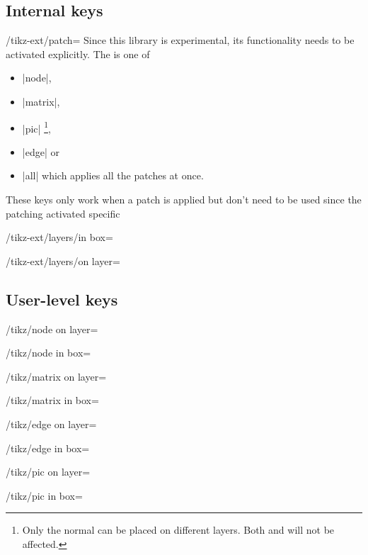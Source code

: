 \begin{multicols}{2}
\subsection{Internal keys}
\begin{key}{/tikz-ext/patch=}
Since this library is experimental, its functionality needs to be activated explicitly.
The  is one of
\begin{itemize}
\item |node|,
\item |matrix|,
\item |pic|%
  \footnote{Only the normal 
            can be placed on different layers.
            Both 
            and 
            will not be affected.},
\item |edge| or
\item |all| which applies all the patches at once.
\end{itemize}
\end{key}

These keys only work when a patch is applied but don't need to be used
since the patching activated specific
\begin{key}{/tikz-ext/layers/in box=}
\end{key}

\begin{key}{/tikz-ext/layers/on layer=}
\end{key}

\subsection{User-level keys}
\begin{key}{/tikz/node on layer=}
\end{key}
\begin{key}{/tikz/node in box=}
\end{key}

\begin{key}{/tikz/matrix on layer=}
\end{key}
\begin{key}{/tikz/matrix in box=}
\end{key}

\begin{key}{/tikz/edge on layer=}
\end{key}
\begin{key}{/tikz/edge in box=}
\end{key}

\begin{key}{/tikz/pic on layer=}
\end{key}
\begin{key}{/tikz/pic in box=}
\end{key}
\end{multicols}